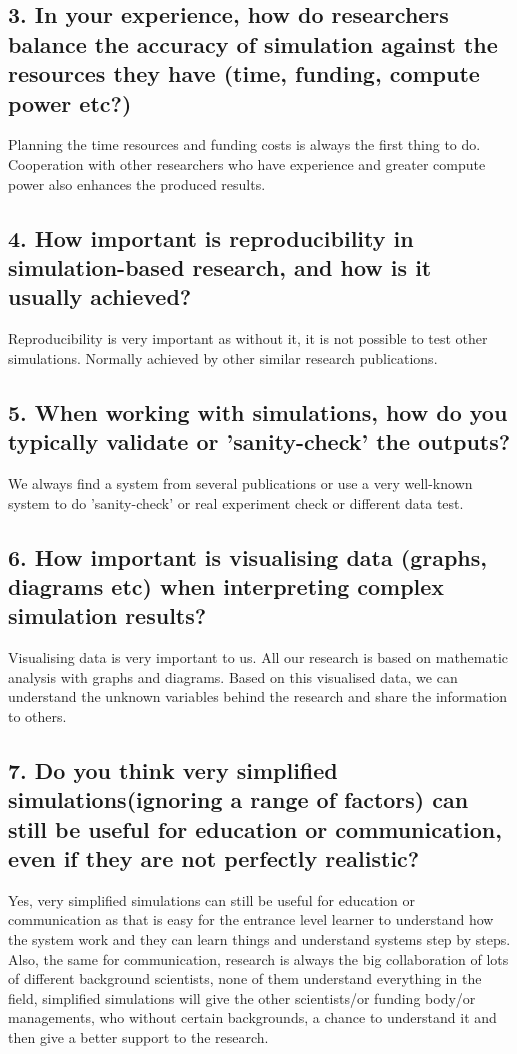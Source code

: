 \subsection*{3. In your experience, how do researchers balance the accuracy of simulation against the resources they have (time, funding, compute power etc?)}
Planning the time resources and funding costs is always the first thing to do. Cooperation with other researchers who have experience and greater compute power also enhances the produced results.
\subsection*{4. How important is reproducibility in simulation-based research, and how is it usually achieved?}
Reproducibility is very important as without it, it is not possible to test other simulations. Normally achieved by other similar research publications.
\subsection*{5. When working with simulations, how do you typically validate or 'sanity-check' the outputs?}
We always find a system from several publications or use a very well-known system to do 'sanity-check' or real experiment check or different data test.
\subsection*{6. How important is visualising data (graphs, diagrams etc) when interpreting complex simulation results?}
Visualising data is very important to us. All our research is based on mathematic analysis with graphs and diagrams. Based on this visualised data, we can understand the unknown variables behind the research and share the information to others.
\subsection*{7. Do you think very simplified simulations(ignoring a range of factors) can still be useful for education or communication, even if they are not perfectly realistic?}
Yes, very simplified simulations can still be useful for education or communication as that is easy for the entrance level learner to understand how the system work and they can learn things and understand systems step by steps. Also, the same for communication, research is always the big collaboration of lots of different background scientists, none of them understand everything in the field, simplified simulations will give the other scientists/or funding body/or managements, who without certain backgrounds, a chance to understand it and then give a better support to the research. 
